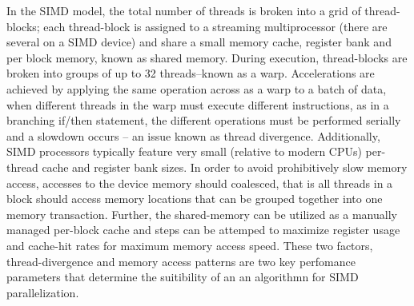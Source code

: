 \documentclass[preprint,12pt]{elsarticle}
\begin{document}
In the SIMD model, the total number of threads is broken into a grid of thread-blocks; each thread-block is assigned to a streaming multiprocessor (there are several on a SIMD device) and share a small memory cache, register bank and per block memory, known as shared memory.
During execution, thread-blocks are broken into groups of up to 32 threads--known as a warp.
Accelerations are achieved by applying the same operation across as a warp to a batch of data, when different threads in the warp must execute different instructions, as in a branching if/then statement, the different operations must be performed serially and a slowdown occurs -- an issue known as thread divergence.
Additionally, SIMD processors typically feature very small (relative to modern CPUs) per-thread cache and register bank sizes.
In order to avoid prohibitively slow memory access, accesses to the device memory should coalesced, that is all threads in a block should access memory locations that can be grouped together into one memory transaction.
Further, the shared-memory can be utilized as a manually managed per-block cache and steps can be attemped to maximize register usage and cache-hit rates for maximum memory access speed.
These two factors, thread-divergence and memory access patterns are two key perfomance parameters that determine the suitibility of an an algorithmn for SIMD parallelization.
\end{document}
